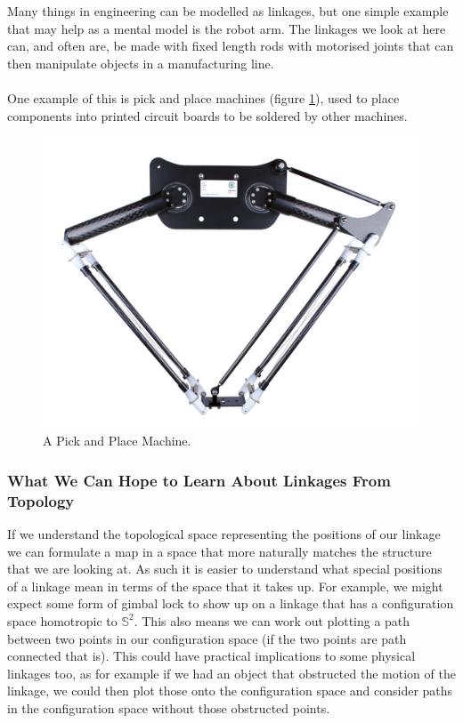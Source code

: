 \documentclass{article}
\begin{document}
Many things in engineering can be modelled as linkages, but one simple example that may help as a mental model is the robot arm. The linkages we look at here can, and often are, be made with fixed length rods with motorised joints that can then manipulate objects in a manufacturing line. \\\\ One example of this is pick and place machines (figure \ref{fig:Pick and Place Machine}), used to place components into printed circuit boards to be soldered by other machines.

\begin{figure}[h!]
\centering
\includegraphics[scale=0.5]{./images/two_axis_pick_and_place.jpg}
\caption{A Pick and Place Machine.}
\label{fig:Pick and Place Machine}
\end{figure}

\subsubsection{What We Can Hope to Learn About Linkages From Topology}

If we understand the topological space representing the positions of our linkage we can formulate a map in a space that more naturally matches the structure that we are looking at. As such it is easier to understand what special positions of a linkage mean in terms of the space that it takes up. For example, we might expect some form of gimbal lock to show up on a linkage that has a configuration space homotropic to $\mathbb S^2$. This also means we can work out plotting a path between two points in our configuration space (if the two points are path connected that is). This could have practical implications to some physical linkages too, as for example if we had an object that obstructed the motion of the linkage, we could then plot those onto the configuration space and consider paths in the configuration space without those obstructed points.
\end{document}
